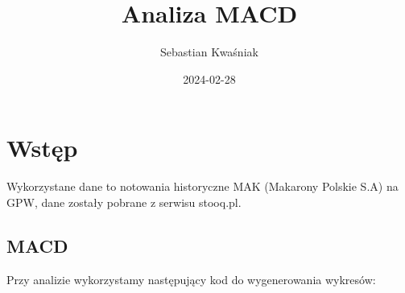\documentclass[
]{article}
\title{Analiza MACD}
\author{Sebastian Kwaśniak}
\date{2024-02-28}
\begin{document}
\maketitle

\section{Wstęp}\label{wstux119p}

Wykorzystane dane to notowania historyczne MAK (Makarony Polskie S.A) na
GPW, dane zostały pobrane z serwisu stooq.pl.

\subsection{MACD}\label{macd}

Przy analizie wykorzystamy następujący kod do wygenerowania wykresów:
\end{document}
